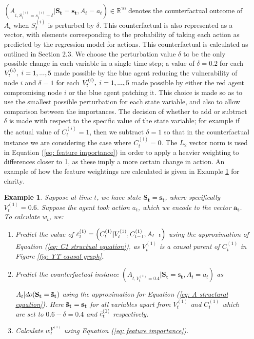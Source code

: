 \documentclass{article}
\newtheorem{example}[theorem]{Example}
\begin{document}
\noindent$(A_{t, S^{(i)}_t = s_t^{(i)} + \delta} | \mathbf{S_t = s_t}, A_t = a_t) \in \mathbb{R}^{10}$ denotes the counterfactual outcome of $A_t$ when $S^{(i)}_t$ is perturbed by $\delta$. This counterfactual is also represented as a vector, with elements corresponding to the probability of taking each action as predicted by the regression model for actions. This counterfactual is calculated as outlined in Section 2.3. We choose the perturbation value $\delta$ to be the only possible change in each variable in a single time step; a value of $\delta = 0.2$ for each $V^{(i)}_t, \hspace{1mm} i = 1,...,5$ made possible by the blue agent reducing the vulnerability of node $i$ and $\delta = 1$ for each $V^{(i)}_t, \hspace{1mm} i = 1,...,5$ made possible by either the red agent compromising node $i$ or the blue agent patching it. This choice is made so as to use the smallest possible perturbation for each state variable, and also to allow comparison between the importances. The decision of whether to add or subtract $\delta$ is made with respect to the specific value of the state variable; for example if the actual value of $C_t^{(i)} = 1$, then we subtract $\delta = 1$ so that in the counterfactual instance we are considering the case where $C_t^{(i)} = 0$. The $L_2$ vector norm is used in Equation (\ref{eq: feature importance}) in order to apply a heavier weighting to differences closer to 1, as these imply a more certain change in action. An example of how the feature weightings are calculated is given in Example \ref{ex: weighting calc} for clarity.

\begin{example}
\label{ex: weighting calc}
    Suppose at time $t$, we have state $\mathbf{S_t = s_t}$, where specifically $V^{(1)}_t = 0.6$. Suppose the agent took action $a_t$, which we encode to the vector $\mathbf{a_t}$. To calculate $w_t$, we:
    \begin{enumerate}
        \item Predict the value of $\Tilde{c}^{(1)}_t = \left( C^{(1)}_t | V^{(1)}_t, C^{(1)}_{t-1}, A_{t-1} \right)$ using the approximation of Equation (\ref{eq: C1 structual equation}), as $V^{(1)}_t$ is a causal parent of $C^{(1)}_t$ in Figure \ref{fig: YT causal graph}.
        \item Predict the counterfactual instance 
        $(A_{t, V^{(1)}_t = 0.4} | \mathbf{S_t = s_t}, A_t = a_t)$ as 
        
        $A_t|do(\mathbf{S_t = \Tilde{s}_t})$ using the approximation for Equation (\ref{eq: A structural equation}). Here $\mathbf{\Tilde{s}_t} = \mathbf{s_t}$ for all variables apart from $V^{(1)}_t$ and $C^{(1)}_t$ which are set to $0.6 -\delta = 0.4$ and $\Tilde{c}^{(1)}_t$ respectively.
        \item Calculate $w^{V^{(1)}}_t$ using Equation (\ref{eq: feature importance}).
    \end{enumerate}
\end{example}
\end{document}
